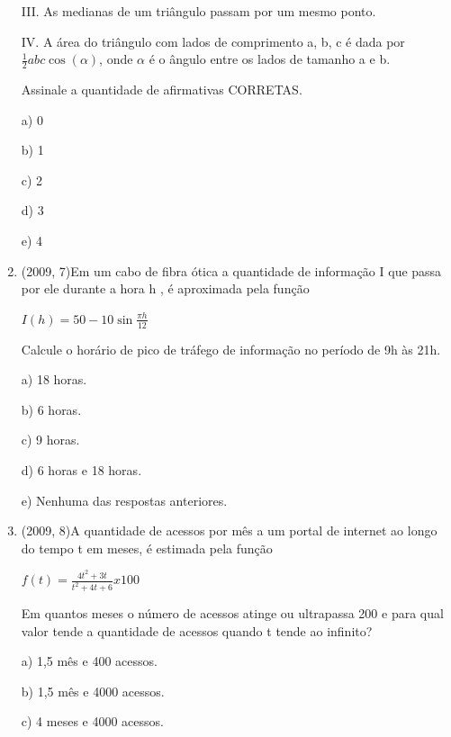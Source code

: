 \documentclass{article}
\begin{document}
\begin{enumerate}
III. As medianas de um triângulo passam por um mesmo ponto.

IV. A área do triângulo com lados de comprimento a, b, c é dada por $\frac{1}{2}abc \cos{(\alpha)}$, onde $\alpha$ é o ângulo entre os lados de tamanho a e b.\newline

Assinale a quantidade de afirmativas CORRETAS.\newline

a) 0

b) 1

c) 2

d) 3

e) 4\newline





\item(2009, 7)Em um cabo de fibra ótica a quantidade de informação I que passa por ele durante a
hora h , é aproximada pela função\newline

$I(h) = 50 - 10 \sin{\frac{\pi h}{12}}$\newline

Calcule o horário de pico de tráfego de informação no período de 9h às 21h.\newline

a) 18 horas.

b) 6 horas.

c) 9 horas.

d) 6 horas e 18 horas.

e) Nenhuma das respostas anteriores.\newline





\item(2009, 8)A quantidade de acessos por mês a um portal de internet ao longo do tempo t em
meses, é estimada pela função\newline

$f(t)= \frac{4t^2 + 3t}{t^2 + 4t + 6}x100$\newline

Em quantos meses o número de acessos atinge ou ultrapassa 200 e para qual valor
tende a quantidade de acessos quando t tende ao infinito?\newline


a) 1,5 mês e 400 acessos.

b) 1,5 mês e 4000 acessos.

c) 4 meses e 4000 acessos.


\end{enumerate}
\end{document}
